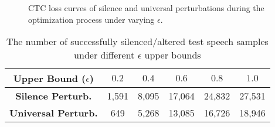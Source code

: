 \begin{figure}[!t]
	\centering  %
	\caption{CTC loss curves of silence and universal perturbations during the optimization process under varying $\epsilon$.}    %
	\label{fig:dig_exp1}    %
	\vspace{-10pt}
\end{figure}

\begin{table}[t]\footnotesize
	\centering
		\caption{The number of successfully silenced/altered test speech samples under different $\epsilon$ upper bounds}
		\renewcommand\arraystretch{0.8}
		\renewcommand\tabcolsep{5pt}
		\begin{threeparttable}
			\begin{tabular}{c|c|c|c|c|c}
				\toprule
				\textbf{Upper Bound ($\epsilon$) } & \textbf{$0.2$} & \textbf{$0.4$} & \textbf{$0.6$} & \textbf{$0.8$} & \textbf{$1.0$} \\
				\midrule
				\textbf{Silence Perturb.} & 1,591 & 8,095 & 17,064 & 24,832 & 27,531 \\ \midrule
				\textbf{Universal Perturb.} & 649 & 5,268 & 13,085 & 16,726 & 18,946 \\
				\bottomrule
			\end{tabular}
		\end{threeparttable}
		\label{tab:dig_exp1}
\end{table}


